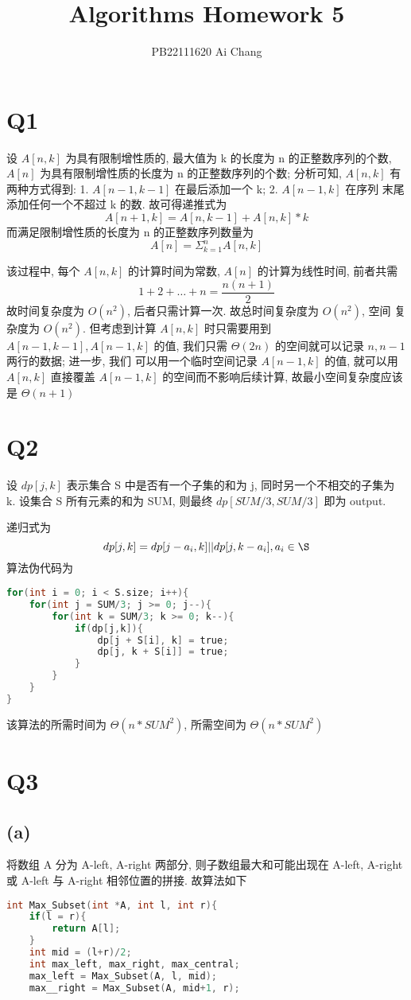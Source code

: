 \documentclass[UTF8]{ctexart}
\title{Algorithms Homework 5}
\author{PB22111620 Ai Chang}
\begin{document}
\begin{sloppypar}
\maketitle

\section*{Q1}
设 $A[n, k]$ 为具有限制增性质的, 最大值为 k 的长度为 n 的正整数序列的个数,
$A[n]$ 为具有限制增性质的长度为 n 的正整数序列的个数; 分析可知, $A[n, k]$
有两种方式得到: 1. $A[n-1, k-1]$ 在最后添加一个 k; 2. $A[n-1, k]$ 在序列
末尾添加任何一个不超过 k 的数. 故可得递推式为
\[A[n+1, k] = A[n,k-1] + A[n, k] * k\]
而满足限制增性质的长度为 n 的正整数序列数量为
\[A[n] = \Sigma_{k=1}^{n}A[n,k]\]

该过程中, 每个 $A[n, k]$ 的计算时间为常数, $A[n]$ 的计算为线性时间, 前者共需
\[1 + 2 + \ldots + n = \frac{n(n+1)}{2}\]
故时间复杂度为 $O(n^2)$, 后者只需计算一次. 故总时间复杂度为 $O(n^2)$, 空间
复杂度为 $O(n^2)$. 但考虑到计算 $A[n,k]$ 时只需要用到 $A[n-1,k-1],A[n-1,k]$
的值, 我们只需 $\Theta(2n)$ 的空间就可以记录 $n,n-1$ 两行的数据; 进一步, 我们
可以用一个临时空间记录 $A[n-1,k]$ 的值, 就可以用 $A[n,k]$ 直接覆盖 $A[n-1,k]$
的空间而不影响后续计算, 故最小空间复杂度应该是 $\Theta(n+1)$

\section*{Q2}

设 $dp[j,k]$ 表示集合 S 中是否有一个子集的和为 j, 同时另一个不相交的子集为 k.
设集合 S 所有元素的和为 SUM, 则最终 $dp[SUM/3, SUM/3]$ 即为 output.

递归式为 \[dp[j,k] = dp[j-a_i, k] || dp[j, k-a_i], a_i \in \S\]
算法伪代码为
\begin{lstlisting}[language=C]
for(int i = 0; i < S.size; i++){
    for(int j = SUM/3; j >= 0; j--){
        for(int k = SUM/3; k >= 0; k--){
            if(dp[j,k]){
                dp[j + S[i], k] = true;
                dp[j, k + S[i]] = true;
            }
        }
    }
}
\end{lstlisting}
该算法的所需时间为 $\Theta(n*SUM^2)$, 所需空间为 $\Theta(n*SUM^2)$

\section*{Q3}
\subsection*{(a)}
将数组 A 分为 A-left, A-right 两部分, 则子数组最大和可能出现在 A-left, A-right 或
A-left 与 A-right 相邻位置的拼接. 故算法如下
\begin{lstlisting}[language=C]
int Max_Subset(int *A, int l, int r){
    if(l = r){
        return A[l];
    }
    int mid = (l+r)/2; 
    int max_left, max_right, max_central;
    max_left = Max_Subset(A, l, mid);
    max__right = Max_Subset(A, mid+1, r);


\end{lstlisting}
\end{sloppypar}
\end{document}
